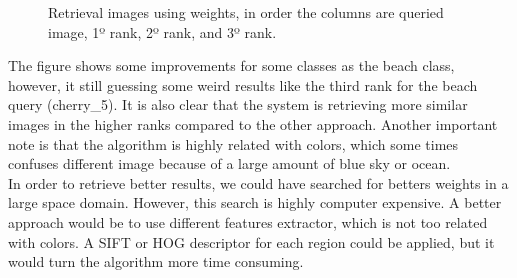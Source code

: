 \documentclass[12pt,a4paper]{article}
\begin{document}
\begin{figure}[!h]
{{		}
	}
	\enskip
	{
		{
			\setlength{\fboxsep}{1pt}
			\setlength{\fboxrule}{1pt}
		}
	}
	
	
	\caption{Retrieval images using weights, in order the columns are queried image, 1º rank, 2º rank, and 3º rank.}
	\label{fig:complexAvr}
\end{figure}

The figure shows some improvements for some classes as the beach class, however, it still guessing some weird results like the third rank for the beach query (cherry\_5). It is also clear that the system is retrieving more similar images in the higher ranks compared to the other approach. Another important note is that the algorithm is highly related with colors, which some times confuses different image because of a large amount of blue sky or ocean. \\

In order to retrieve better results, we could have searched for betters weights in a large space domain. However, this search is highly computer expensive. A better approach would be to use different features extractor, which is not too related with colors. A SIFT or HOG descriptor for each region could be applied, but it would turn the algorithm more time consuming. 
\end{document}
